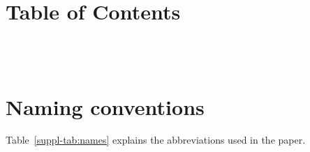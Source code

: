 \documentclass{bmcart}
\def\ta{Timed Automaton}
\def\tas{Timed Automata}
\begin{document}
\makeatother


\startcontents[appendices]
\stopcontents[appendices]


\thispagestyle{empty}
\renewcommand\contentsname{Table of Contents}
\section*{Table of Contents}
\ \\ \ \\
\clearpage


\resumecontents[appendices]


\setcounter{page}{1}
\setcounter{section}{0}

\renewcommand\figurename{Figure}
\renewcommand*\thefigure{S\arabic{figure}}
\renewcommand*\thetable{S\arabic{table}}

\def\ta{TA}
\def\tas{TA}




\clearpage
\section{Naming conventions}\label{suppl-sec:names}
Table~\ref{suppl-tab:names} explains the abbreviations used in the paper.
\end{document}
